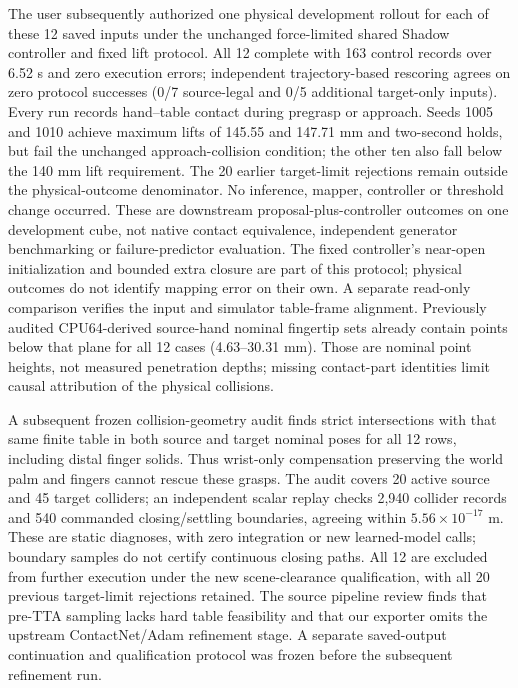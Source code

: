 \documentclass[10pt,letterpaper]{article}
\begin{document}
The user subsequently authorized one physical development rollout for each of
these 12 saved inputs under the unchanged force-limited shared Shadow controller
and fixed lift protocol. All 12 complete with 163 control records over 6.52 s
and zero execution errors; independent trajectory-based rescoring agrees on
zero protocol successes (0/7 source-legal and 0/5 additional target-only inputs).
Every run records hand--table contact during pregrasp or approach. Seeds 1005
and 1010 achieve maximum lifts of 145.55 and 147.71 mm and two-second holds,
but fail the unchanged approach-collision condition; the other ten also fall
below the 140 mm lift requirement. The 20 earlier target-limit rejections remain
outside the physical-outcome denominator. No inference, mapper, controller or
threshold change occurred. These are downstream proposal-plus-controller
outcomes on one development cube, not native contact equivalence, independent
generator benchmarking or failure-predictor evaluation. The fixed controller's
near-open initialization and bounded extra closure are part of this protocol;
physical outcomes do not identify mapping error on their own.
A separate read-only comparison verifies the input and simulator table-frame
alignment. Previously audited CPU64-derived source-hand nominal fingertip sets
already contain points below that plane for all 12 cases (4.63--30.31 mm).
Those are nominal point heights, not measured penetration depths; missing
contact-part identities limit causal attribution of the physical collisions.

A subsequent frozen collision-geometry audit finds strict intersections with
that same finite table in both source and target nominal poses for all 12 rows,
including distal finger solids. Thus wrist-only compensation preserving the
world palm and fingers cannot rescue these grasps. The audit covers 20 active
source and 45 target colliders; an independent scalar replay checks 2,940
collider records and 540 commanded closing/settling boundaries, agreeing within
$5.56\times10^{-17}$ m. These are static diagnoses, with zero integration or
new learned-model calls; boundary samples do not certify continuous closing
paths. All 12 are excluded from further execution under the new scene-clearance
qualification, with all 20 previous target-limit rejections retained. The source
pipeline review finds that pre-TTA sampling lacks hard table feasibility and
that our exporter omits the upstream ContactNet/Adam refinement stage. A
separate saved-output continuation and qualification protocol was frozen before
the subsequent refinement run.
\end{document}
